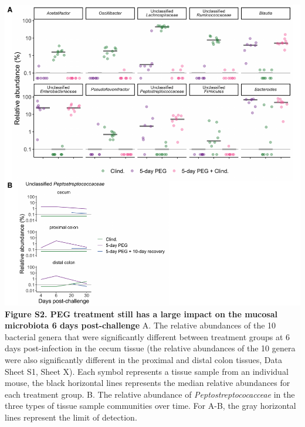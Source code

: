 \documentclass[
  11pt,
]{article}
\begin{document}
\includegraphics{figure_S2.pdf} \textbf{Figure S2. PEG treatment still
has a large impact on the mucosal microbiota 6 days post-challenge} A.
The relative abundances of the 10 bacterial genera that were
significantly different between treatment groups at 6 days
post-infection in the cecum tissue (the relative abundances of the 10
genera were also significantly different in the proximal and distal
colon tissues, Data Sheet S1, Sheet X). Each symbol represents a tissue
sample from an individual mouse, the black horizontal lines represents
the median relative abundances for each treatment group. B. The relative
abundance of \emph{Peptostreptococacceae} in the three types of tissue
sample communities over time. For A-B, the gray horizontal lines
represent the limit of detection. \newpage
\end{document}
